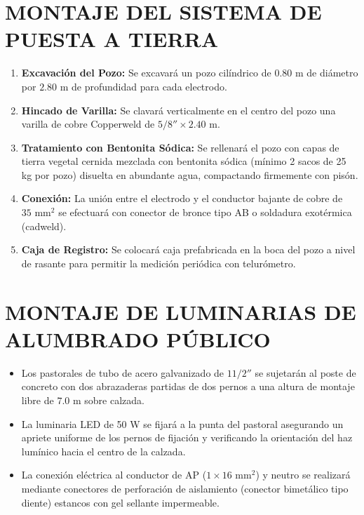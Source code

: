 \section{MONTAJE DEL SISTEMA DE PUESTA A TIERRA}

\begin{enumerate}
  \item \textbf{Excavación del Pozo:} Se excavará un pozo cilíndrico de $0.80\text{ m}$ de diámetro por $2.80\text{ m}$ de profundidad para cada electrodo.
  \item \textbf{Hincado de Varilla:} Se clavará verticalmente en el centro del pozo una varilla de cobre Copperweld de $5/8'' \times 2.40\text{ m}$.
  \item \textbf{Tratamiento con Bentonita Sódica:} Se rellenará el pozo con capas de tierra vegetal cernida mezclada con bentonita sódica (mínimo 2 sacos de 25 kg por pozo) disuelta en abundante agua, compactando firmemente con pisón.
  \item \textbf{Conexión:} La unión entre el electrodo y el conductor bajante de cobre de $35\text{ mm}^2$ se efectuará con conector de bronce tipo AB o soldadura exotérmica (cadweld).
  \item \textbf{Caja de Registro:} Se colocará caja prefabricada en la boca del pozo a nivel de rasante para permitir la medición periódica con telurómetro.
\end{enumerate}

\section{MONTAJE DE LUMINARIAS DE ALUMBRADO PÚBLICO}

\begin{itemize}
  \item Los pastorales de tubo de acero galvanizado de $1 1/2''$ se sujetarán al poste de concreto con dos abrazaderas partidas de dos pernos a una altura de montaje libre de $7.0\text{ m}$ sobre calzada.
  \item La luminaria LED de 50 W se fijará a la punta del pastoral asegurando un apriete uniforme de los pernos de fijación y verificando la orientación del haz lumínico hacia el centro de la calzada.
  \item La conexión eléctrica al conductor de AP ($1 \times 16\text{ mm}^2$) y neutro se realizará mediante conectores de perforación de aislamiento (conector bimetálico tipo diente) estancos con gel sellante impermeable.
\end{itemize}

